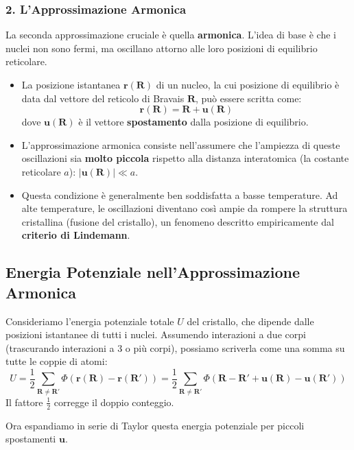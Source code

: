 \subsubsection{2. L'Approssimazione Armonica}
La seconda approssimazione cruciale è quella \textbf{armonica}. L'idea di base è che i nuclei non sono fermi, ma oscillano attorno alle loro posizioni di equilibrio reticolare.

\begin{itemize}
    \item La posizione istantanea \(\mathbf{r}(\mathbf{R})\) di un nucleo, la cui posizione di equilibrio è data dal vettore del reticolo di Bravais \(\mathbf{R}\), può essere scritta come:
    \[ \mathbf{r}(\mathbf{R}) = \mathbf{R} + \mathbf{u}(\mathbf{R}) \]
    dove \(\mathbf{u}(\mathbf{R})\) è il vettore \textbf{spostamento} dalla posizione di equilibrio.
    \item L'approssimazione armonica consiste nell'assumere che l'ampiezza di queste oscillazioni sia \textbf{molto piccola} rispetto alla distanza interatomica (la costante reticolare \(a\)): \(|\mathbf{u}(\mathbf{R})| \ll a\).
    \item Questa condizione è generalmente ben soddisfatta a basse temperature. Ad alte temperature, le oscillazioni diventano così ampie da rompere la struttura cristallina (fusione del cristallo), un fenomeno descritto empiricamente dal \textbf{criterio di Lindemann}.
\end{itemize}

\subsection{Energia Potenziale nell'Approssimazione Armonica}

Consideriamo l'energia potenziale totale \(U\) del cristallo, che dipende dalle posizioni istantanee di tutti i nuclei. Assumendo interazioni a due corpi (trascurando interazioni a 3 o più corpi), possiamo scriverla come una somma su tutte le coppie di atomi:
\[ U = \frac{1}{2} \sum_{\mathbf{R} \neq \mathbf{R'}} \Phi(\mathbf{r}(\mathbf{R}) - \mathbf{r}(\mathbf{R'})) = \frac{1}{2} \sum_{\mathbf{R} \neq \mathbf{R'}} \Phi(\mathbf{R} - \mathbf{R'} + \mathbf{u}(\mathbf{R}) - \mathbf{u}(\mathbf{R'})) \]
Il fattore \(\frac{1}{2}\) corregge il doppio conteggio.

Ora espandiamo in serie di Taylor questa energia potenziale per piccoli spostamenti \(\mathbf{u}\).

